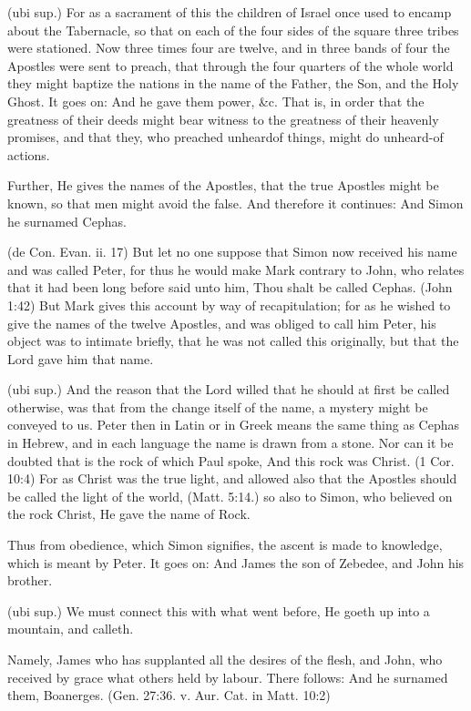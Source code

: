  (ubi sup.) For as a sacrament of this the children of Israel once used to encamp about the Tabernacle, so that on each of the four sides of the square three tribes were stationed. Now three times four are twelve, and in three bands of four the Apostles were sent to preach, that through the four quarters of the whole world they might baptize the nations in the name of the Father, the Son, and the Holy Ghost. It goes on: And he gave them power, \&c. That is, in order that the greatness of their deeds might bear witness to the greatness of their heavenly promises, and that they, who preached unheardof things, might do unheard-of actions.

 Further, He gives the names of the Apostles, that the true Apostles might be known, so that men might avoid the false. And therefore it continues: And Simon he surnamed Cephas.

 (de Con. Evan. ii. 17) But let no one suppose that Simon now received his name and was called Peter, for thus he would make Mark contrary to John, who relates that it had been long before said unto him, Thou shalt be called Cephas. (John 1:42) But Mark gives this account by way of recapitulation; for as he wished to give the names of the twelve Apostles, and was obliged to call him Peter, his object was to intimate briefly, that he was not called this originally, but that the Lord gave him that name.

 (ubi sup.) And the reason that the Lord willed that he should at first be called otherwise, was that from the change itself of the name, a mystery might be conveyed to us. Peter then in Latin or in Greek means the same thing as Cephas in Hebrew, and in each language the name is drawn from a stone. Nor can it be doubted that is the rock of which Paul spoke, And this rock was Christ. (1 Cor. 10:4) For as Christ was the true light, and allowed also that the Apostles should be called the light of the world, (Matt. 5:14.) so also to Simon, who believed on the rock Christ, He gave the name of Rock.

 Thus from obedience, which Simon signifies, the ascent is made to knowledge, which is meant by Peter. It goes on: And James the son of Zebedee, and John his brother.

 (ubi sup.) We must connect this with what went before, He goeth up into a mountain, and calleth.

 Namely, James who has supplanted all the desires of the flesh, and John, who received by grace what others held by labour. There follows: And he surnamed them, Boanerges. (Gen. 27:36. v. Aur. Cat. in Matt. 10:2)

